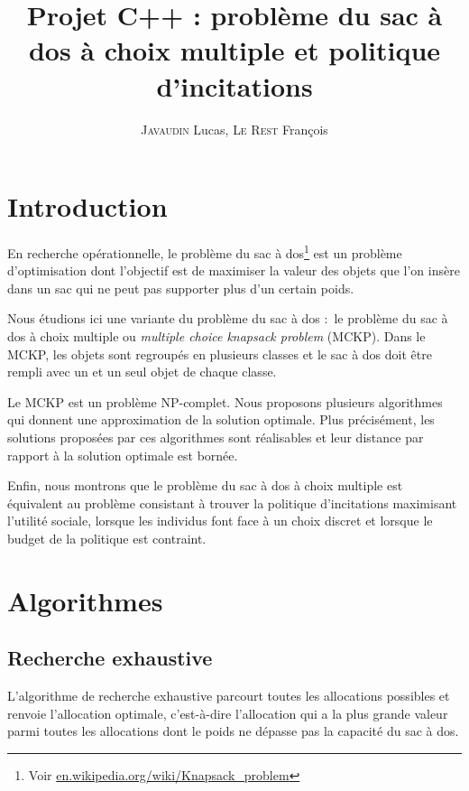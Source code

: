 \documentclass{article}
\title{Projet C++ : problème du sac à dos à choix multiple et politique d'incitations}
\author{\textsc{Javaudin} Lucas, \textsc{Le Rest} François}
\begin{document}
\maketitle

\tableofcontents

\newpage

\section{Introduction}

En recherche opérationnelle, le problème du sac à dos\footnote{Voir \url{en.wikipedia.org/wiki/Knapsack_problem}} est un problème d'optimisation dont l'objectif est de maximiser la valeur des objets que l'on insère dans un sac qui ne peut pas supporter plus d'un certain poids.

Nous étudions ici une variante du problème du sac à dos : le problème du sac à dos à choix multiple ou \textit{multiple choice knapsack problem} (MCKP).
Dans le MCKP, les objets sont regroupés en plusieurs classes et le sac à dos doit être rempli avec un et un seul objet de chaque classe.

Le MCKP est un problème NP-complet.
Nous proposons plusieurs algorithmes qui donnent une approximation de la solution optimale.
Plus précisément, les solutions proposées par ces algorithmes sont réalisables et leur distance par rapport à la solution optimale est bornée.

Enfin, nous montrons que le problème du sac à dos à choix multiple est équivalent au problème consistant à trouver la politique d'incitations maximisant l'utilité sociale, lorsque les individus font face à un choix discret et lorsque le budget de la politique est contraint.

\newpage
\section{Algorithmes}

\subsection{Recherche exhaustive}

L'algorithme de recherche exhaustive parcourt toutes les allocations possibles et renvoie l'allocation optimale, c'est-à-dire l'allocation qui a la plus grande valeur parmi toutes les allocations dont le poids ne dépasse pas la capacité du sac à dos.
\end{document}
